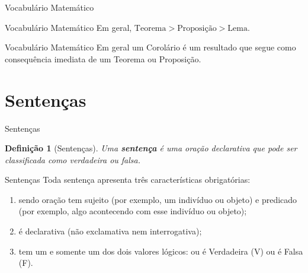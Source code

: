 \documentclass[10pt]{beamer}
\renewcommand{\indent}{\hspace*{2em}}
\theoremstyle{plain}
\newtheorem{defn}{Definição}[section]
\begin{document}
\begin{frame}{Vocabulário Matemático}
\begin{center}
\end{center}
\end{frame}

\begin{frame}{Vocabulário Matemático}
\indent Em geral, $\mbox{Teorema}>\mbox{Proposição}>\mbox{Lema}$.
\end{frame}

\begin{frame}{Vocabulário Matemático}
\indent Em geral um Corolário é um resultado que segue como consequência imediata de um Teorema ou Proposição.
\end{frame}

\section{Sentenças}

\begin{frame}{Sentenças}
\begin{defn}[Sentenças]
\vfill\indent Uma \textbf{sentença} é uma oração declarativa que pode ser classificada como verdadeira ou falsa.
\end{defn}
\end{frame}

\begin{frame}{Sentenças}
    \indent Toda sentença apresenta três características obrigatórias:
    \begin{enumerate}
        \item sendo oração tem sujeito (por exemplo, um indivíduo ou objeto) e predicado (por exemplo, algo acontecendo com esse indivíduo ou objeto);
        \item é declarativa (não exclamativa nem interrogativa);
        \item tem um e somente um dos dois valores lógicos: ou é Verdadeira (V) ou é Falsa (F).
    \end{enumerate}
\end{frame}
\end{document}
